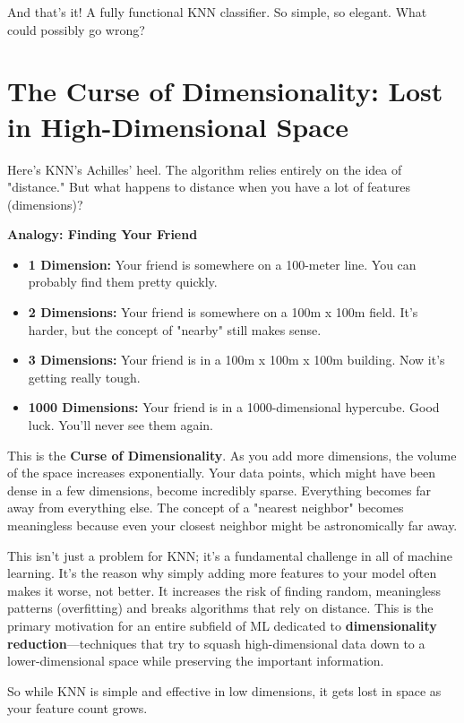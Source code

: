 \documentclass[11pt, letterpaper, openany]{book}
\begin{document}
And that's it! A fully functional KNN classifier. So simple, so elegant. What could possibly go wrong?

\section{The Curse of Dimensionality: Lost in High-Dimensional Space}

Here's KNN's Achilles' heel. The algorithm relies entirely on the idea of "distance." But what happens to distance when you have a lot of features (dimensions)?

\textbf{Analogy: Finding Your Friend}
\begin{itemize}
    \item \textbf{1 Dimension:} Your friend is somewhere on a 100-meter line. You can probably find them pretty quickly.
    \item \textbf{2 Dimensions:} Your friend is somewhere on a 100m x 100m field. It's harder, but the concept of "nearby" still makes sense.
    \item \textbf{3 Dimensions:} Your friend is in a 100m x 100m x 100m building. Now it's getting really tough.
    \item \textbf{1000 Dimensions:} Your friend is in a 1000-dimensional hypercube. Good luck. You'll never see them again.
\end{itemize}

This is the \textbf{Curse of Dimensionality}. As you add more dimensions, the volume of the space increases exponentially. Your data points, which might have been dense in a few dimensions, become incredibly sparse. Everything becomes far away from everything else. The concept of a "nearest neighbor" becomes meaningless because even your closest neighbor might be astronomically far away.

This isn't just a problem for KNN; it's a fundamental challenge in all of machine learning. It's the reason why simply adding more features to your model often makes it worse, not better. It increases the risk of finding random, meaningless patterns (overfitting) and breaks algorithms that rely on distance. This is the primary motivation for an entire subfield of ML dedicated to \textbf{dimensionality reduction}—techniques that try to squash high-dimensional data down to a lower-dimensional space while preserving the important information.

So while KNN is simple and effective in low dimensions, it gets lost in space as your feature count grows.
\end{document}
